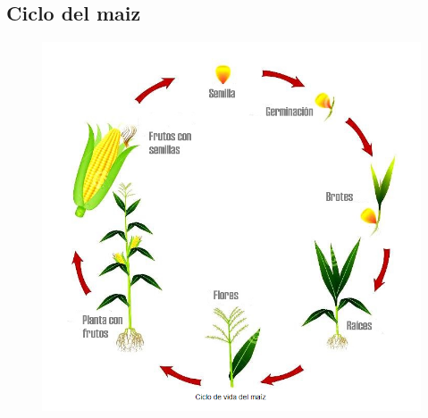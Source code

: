 \documentclass[utf8]{FrontiersinHarvard} %
\begin{document}
\subsection{Ciclo del maiz}
\begin{figure}[h]
    \centering
    \includegraphics[scale=.8]{./images/ciclomaiz.png}
\end{figure}
\end{document}
